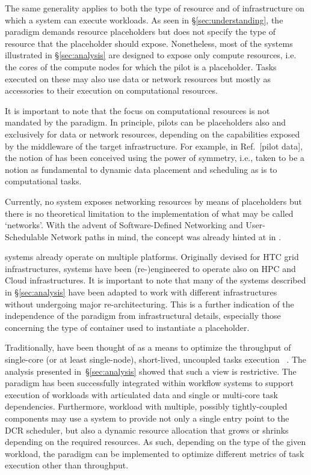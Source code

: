 \documentclass{sig-alternate}
\begin{document}
The same generality applies to both the type of resource and of infrastructure
on which a \pilot system can execute workloads. As seen in
\S\ref{sec:understanding}, the \pilot paradigm demands resource placeholders but
does not specify the type of resource that the placeholder should expose.
Nonetheless, most of the \pilot systems illustrated in \S\ref{sec:analysis} are
designed to expose only compute resources, i.e. the cores of the compute nodes
for which the pilot is a placeholder. Tasks executed on these \pilots may also
use data or network resources but mostly as accessories to their execution on
computational resources.

It is important to note that the focus on computational resources is not
mandated by the \pilot paradigm. In principle, pilots can be placeholders also
and exclusively for data or network resources, depending on the capabilities
exposed by the middleware of the target infrastructure. For example, in
Ref.~[pilot data], the notion of \pilotdata has been conceived using the power
of symmetry, i.e., \pilotdata taken to be a notion as fundamental to dynamic
data placement and scheduling as \pilot is to computational tasks.

Currently, no \pilot system exposes networking resources by means of
placeholders but there is no theoretical limitation to the implementation of
what may be called `\pilot networks'. With the advent of Software-Defined
Networking and User-Schedulable Network paths in mind, the concept was already
hinted at in \cite{santcroos2012}.

\pilot systems already operate on multiple platforms. Originally devised for HTC
grid infrastructures, \pilot systems have been (re-)engineered to operate also
on HPC and Cloud infrastructures. It is important to note that many of the
\pilot systems described in \S\ref{sec:analysis} have been adapted to work with
different infrastructures without undergoing major re-architecturing. This is
a further indication of the independence of the \pilot paradigm from
infrastructural details, especially those concerning the type of container used
to instantiate a placeholder.

Traditionally, \pilots have been thought of as a means to optimize the
throughput of single-core (or at least single-node), short-lived, uncoupled
tasks execution ~\cite{pordes2007,sfiligoi2009,juve2010}. The analysis presented
in~\S\ref{sec:analysis} showed that such a view is restrictive.  The \pilot
paradigm has been successfully integrated within workflow systems to support
execution of workloads with articulated data and single or multi-core task
dependencies. Furthermore, workload with multiple, possibly tightly-coupled
components may use a \pilot system to provide not only a single entry point to
the DCR scheduler, but also a dynamic resource allocation that grows or shrinks
depending on the required resources. As such, depending on the type of the given
workload, the \pilot paradigm can be implemented to optimize different metrics
of task execution other than throughput.
\end{document}
